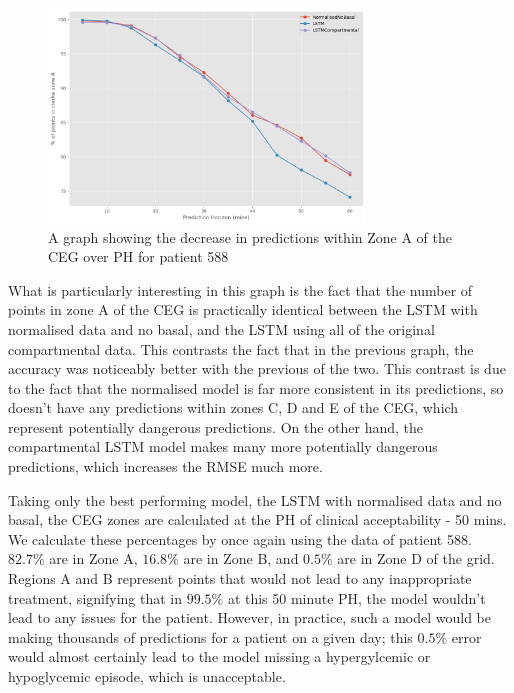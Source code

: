     \begin{figure}[H]
      \centering

      \includegraphics[width=0.75\textwidth]{images/ClarkeOverPH.png}
      \caption{
       A graph showing the decrease in predictions within Zone A of the CEG over PH for patient 588
      }
    \end{figure}

    What is particularly interesting in this graph is the fact that the number of points in zone A of the CEG is practically identical between the LSTM with normalised data and no basal, and the LSTM using all of the original compartmental data. This contrasts the fact that in the previous graph, the accuracy was noticeably better with the previous of the two. This contrast is due to the fact that the normalised model is far more consistent in its predictions, so doesn't have any predictions within zones C, D and E of the CEG, which represent potentially dangerous predictions. On the other hand, the compartmental LSTM model makes many more potentially dangerous predictions, which increases the RMSE much more.

    Taking only the best performing model, the LSTM with normalised data and no basal, the CEG zones are calculated at the PH of clinical acceptability - 50 mins. We calculate these percentages by once again using the data of patient 588. $82.7\%$ are in Zone A, $16.8\%$ are in Zone B, and $0.5\%$ are in Zone D of the grid. Regions A and B represent points that would not lead to any inappropriate treatment, signifying that in $99.5\%$ at this 50 minute PH, the model wouldn't lead to any issues for the patient. However, in practice, such a model would be making thousands of predictions for a patient on a given day; this $0.5\%$ error would almost certainly lead to the model missing a hypergylcemic or hypoglycemic episode, which is unacceptable.

